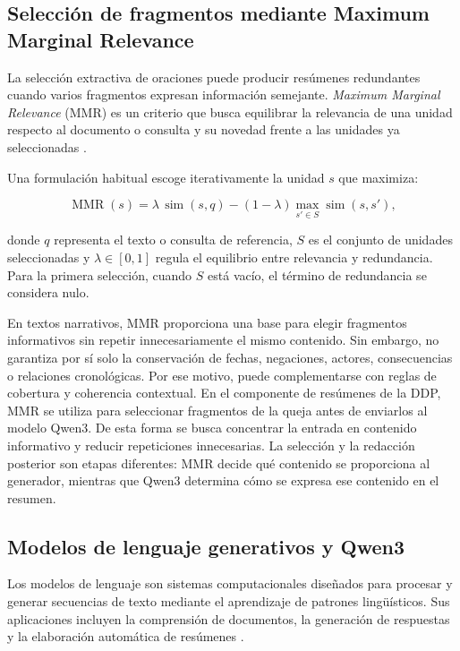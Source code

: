 \subsection{Selección de fragmentos mediante Maximum Marginal Relevance}

La selección extractiva de oraciones puede producir resúmenes redundantes cuando varios fragmentos expresan información semejante. \textit{Maximum Marginal Relevance} (MMR) es un criterio que busca equilibrar la relevancia de una unidad respecto al documento o consulta y su novedad frente a las unidades ya seleccionadas \cite{carbonell1998mmr}.

Una formulación habitual escoge iterativamente la unidad $s$ que maximiza:

\begin{equation}
    \operatorname{MMR}(s) =
    \lambda\,\operatorname{sim}(s,q) -
    (1-\lambda)\max_{s'\in S}
    \operatorname{sim}(s,s'),
    \label{eq:mmr}
\end{equation}

donde $q$ representa el texto o consulta de referencia, $S$ es el conjunto de unidades seleccionadas y $\lambda\in[0,1]$ regula el equilibrio entre relevancia y redundancia. Para la primera selección, cuando $S$ está vacío, el término de redundancia se considera nulo.

En textos narrativos, MMR proporciona una base para elegir fragmentos informativos sin repetir innecesariamente el mismo contenido. Sin embargo, no garantiza por sí solo la conservación de fechas, negaciones, actores, consecuencias o relaciones cronológicas. Por ese motivo, puede complementarse con reglas de cobertura y coherencia contextual. En el componente de resúmenes de la DDP, MMR se utiliza para seleccionar fragmentos de la queja antes de enviarlos al modelo Qwen3. De esta forma se busca concentrar la entrada en contenido informativo y reducir repeticiones innecesarias. La selección y la redacción posterior son etapas diferentes: MMR decide qué contenido se proporciona al generador, mientras que Qwen3 determina cómo se expresa ese contenido en el resumen.

\subsection{Modelos de lenguaje generativos y Qwen3}

Los modelos de lenguaje son sistemas computacionales diseñados para procesar y generar secuencias de texto mediante el aprendizaje de patrones lingüísticos. Sus aplicaciones incluyen la comprensión de documentos, la generación de respuestas y la elaboración automática de resúmenes \cite{jurafsky2023slp}.

